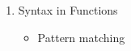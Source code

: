 \documentclass[a4paper,10pt]{article}
\begin{document}
\begin{enumerate}
  \item Syntax in Functions
  \begin{itemize}
   \item Pattern matching
  \end{itemize}

\end{enumerate}
\end{document}
